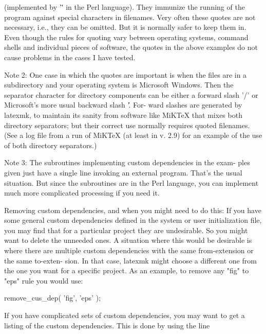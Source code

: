        (implemented  by '\"' in the Perl language).  They immunize the running
       of the program against special characters  in  filenames.   Very  often
       these  quotes  are not necessary, i.e., they can be omitted.  But it is
       normally safer to keep them in.  Even though the rules for quoting vary
       between  operating  systems,  command  shells  and individual pieces of
       software, the quotes in the above examples do not cause problems in the
       cases I have tested.

       Note  2:  One  case in which the quotes are important is when the files
       are in a subdirectory and your operating system is  Microsoft  Windows.
       Then  the  separator character for directory components can be either a
       forward slash '/' or Microsoft's more usual backward slash  '\'.   For-
       ward  slashes  are  generated  by  latexmk, to maintain its sanity from
       software like MiKTeX that mixes both directory  separators;  but  their
       correct use normally requires quoted filenames.  (See a log file from a
       run of MiKTeX (at least in v. 2.9) for an example of the  use  of  both
       directory separators.)

       Note  3:  The subroutines implementing custom dependencies in the exam-
       ples given just have  a  single  line  invoking  an  external  program.
       That's  the usual situation.  But since the subroutines are in the Perl
       language, you can implement much more  complicated  processing  if  you
       need it.


   Removing custom dependencies, and when you might need to do this:
       If  you  have some general custom dependencies defined in the system or
       user initialization file, you may find that for  a  particular  project
       they  are  undesirable.  So you might want to delete the unneeded ones.
       A situation where this would be desirable is where there  are  multiple
       custom  dependencies with the same from-extension or the same to-exten-
       sion. In that case, latexmk might choose a different one from  the  one
       you want for a specific project.  As an example, to remove any "fig" to
       "eps" rule you would use:

           remove_cus_dep( 'fig', 'eps' );

       If you have complicated sets of custom dependencies, you  may  want  to
       get  a  listing  of the custom dependencies.  This is done by using the
       line

